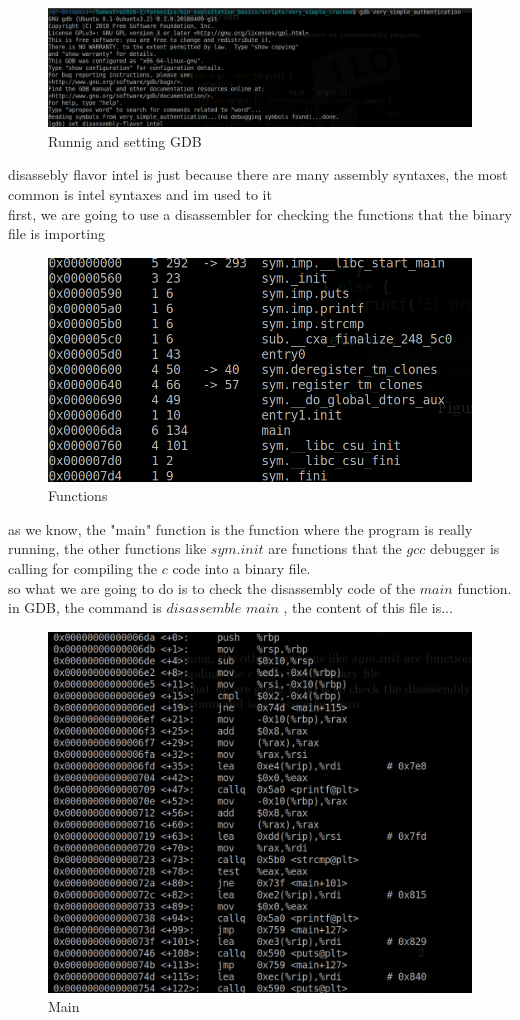 \documentclass[10pt,a4paper]{article} %
\begin{document}
            \begin{figure}[h!]
                \centering
                \includegraphics[width=0.8\linewidth]{disassamblyflavor.png}
                \caption{Runnig and setting GDB}
                \label{setting GDB}
            \end{figure}
            disassebly flavor intel is just because there are many assembly
            syntaxes, the most common is intel syntaxes and im used to it
            \\ first, we are going to use a disassembler for checking the functions
            that the binary file is importing
            \begin{figure}[h!]
                \centering
                \includegraphics[width=0.5\linewidth]{functions.png}
                \caption{Functions}
                \label{fig:functions}
            \end{figure}
            as we know, the "main" function is the function where the program is
            really running, the other functions like $ sym.init  $ are functions
            that the $ gcc  $ debugger is calling for compiling the $ c  $ code
            into a binary file.
            \newpage
            \\ so what we are going to do is to check the disassembly code of the $
            main  $ function.  in GDB, the command is $ disassemble  $ $ main  $ ,
            the content of this file is...
            \begin{figure}[h!]
                \centering
                \includegraphics[width=0.6\linewidth]{main.png}
                \caption{Main}
                \label{fig:main}
            \end{figure}
\end{document}
